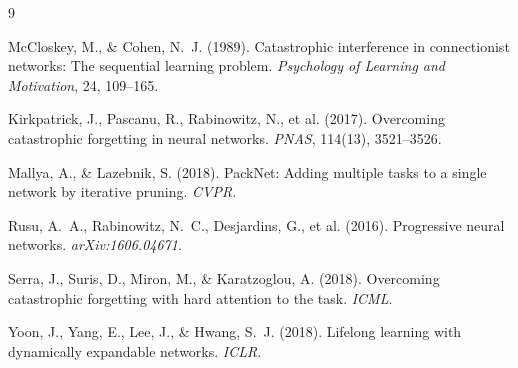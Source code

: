 \documentclass[10pt,twocolumn]{article}
\begin{document}

\begin{thebibliography}{9}

McCloskey, M., \& Cohen, N.~J. (1989).
Catastrophic interference in connectionist networks: The sequential learning problem.
\textit{Psychology of Learning and Motivation}, 24, 109--165.

Kirkpatrick, J., Pascanu, R., Rabinowitz, N., et al. (2017).
Overcoming catastrophic forgetting in neural networks.
\textit{PNAS}, 114(13), 3521--3526.

Mallya, A., \& Lazebnik, S. (2018).
PackNet: Adding multiple tasks to a single network by iterative pruning.
\textit{CVPR}.

Rusu, A.~A., Rabinowitz, N.~C., Desjardins, G., et al. (2016).
Progressive neural networks.
\textit{arXiv:1606.04671}.

Serra, J., Suris, D., Miron, M., \& Karatzoglou, A. (2018).
Overcoming catastrophic forgetting with hard attention to the task.
\textit{ICML}.

Yoon, J., Yang, E., Lee, J., \& Hwang, S.~J. (2018).
Lifelong learning with dynamically expandable networks.
\textit{ICLR}.

\end{thebibliography}
\end{document}
